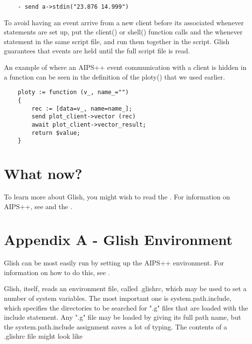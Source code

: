 \begin{verbatim}
	- send a->stdin("23.876 14.999")
\end{verbatim}

    To avoid having an event arrive from a new client before its associated
whenever statements are set up, put the client() or shell() function calls
and the whenever statement in the same script file, and run them together in
the script.  Glish guarantees that events are held until the full script
file is read.

    An example of where an AIPS++ event communication with a client is
hidden in a function can be seen in the definition of the ploty() that we
used earlier.

\begin{verbatim}
	ploty := function (v_, name_="")
	{
	    rec := [data=v_, name=name_];
	    send plot_client->vector (rec)
	    await plot_client->vector_result;
	    return $value;
	}
\end{verbatim}

\section{What now?}

To learn more about Glish, you might wish to read the
. For information on AIPS++,
see  and the
.

\section{Appendix A - Glish Environment}

Glish can be most easily run by setting up the AIPS++ environment.
For information on how to do this, see .

    Glish, itself, reads an environment file, called .glishrc, which may be
used to set a number of system variables.  The most important one is
system.path.include, which specifies the directories to be searched for
".g" files that are loaded with the include statement.  Any ".g" file may
be loaded by giving its full path name, but the system.path.include
assignment saves a lot of typing.  The contents of a .glishrc file might
look like

